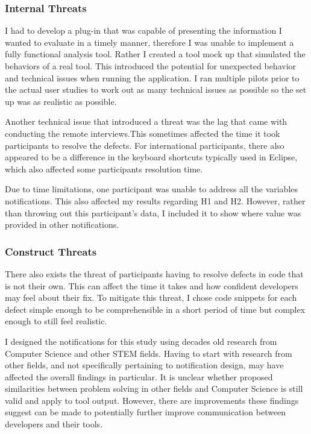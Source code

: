 \subsubsection{Internal Threats}
I had to develop a plug-in that was capable of presenting the information I wanted to evaluate in a timely manner, therefore I was unable to implement a fully functional analysis tool. Rather I created a tool mock up that simulated the behaviors of a real tool. This introduced the potential for unexpected behavior and technical issues when running the application. I ran multiple pilots prior to the actual user studies to work out as many technical issues as possible so the set up was as realistic as possible.

Another technical issue that introduced a threat was the lag that came with conducting the remote interviews.This sometimes affected the time it took participants to resolve the defects.
For international participants, there also appeared to be a difference in the keyboard shortcuts typically used in Eclipse, which also affected some participants resolution time.

Due to time limitations, one participant was unable to address all the variables notifications. This also affected my results regarding H1 and H2. However, rather than throwing out this participant's data, I included it to show where value was provided in other notifications.

\subsubsection{Construct Threats}
There also exists the threat of participants having to resolve defects in code that is not their own. This can affect the time it takes and how confident developers may feel about their fix. To mitigate this threat, I chose code snippets for each defect simple enough to be comprehensible in a short period of time but complex enough to still feel realistic.

I designed the notifications for this study using decades old research from Computer Science and other STEM fields. Having to start with research from other fields, and not specifically pertaining to notification design, may have affected the overall findings in particular. It is unclear whether proposed similarities between problem solving in other fields and Computer Science is still valid and apply to tool output. However, there are improvements these findings suggest can be made to potentially further improve communication between developers and their tools.

